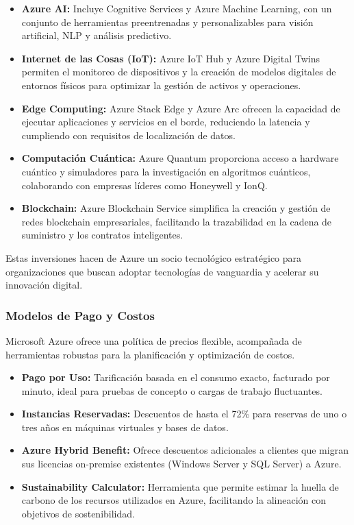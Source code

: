 {                \begin{itemize}
                    \item \textbf{Azure AI:} Incluye Cognitive Services y Azure Machine Learning, con un conjunto de herramientas preentrenadas y personalizables para visión artificial, NLP y análisis predictivo.
                    \item \textbf{Internet de las Cosas (IoT):} Azure IoT Hub y Azure Digital Twins permiten el monitoreo de dispositivos y la creación de modelos digitales de entornos físicos para optimizar la gestión de activos y operaciones.
                    \item \textbf{Edge Computing:} Azure Stack Edge y Azure Arc ofrecen la capacidad de ejecutar aplicaciones y servicios en el borde, reduciendo la latencia y cumpliendo con requisitos de localización de datos.
                    \item \textbf{Computación Cuántica:} Azure Quantum proporciona acceso a hardware cuántico y simuladores para la investigación en algoritmos cuánticos, colaborando con empresas líderes como Honeywell y IonQ.
                    \item \textbf{Blockchain:} Azure Blockchain Service simplifica la creación y gestión de redes blockchain empresariales, facilitando la trazabilidad en la cadena de suministro y los contratos inteligentes.
                \end{itemize}
                    
                Estas inversiones hacen de Azure un socio tecnológico estratégico para organizaciones que buscan adoptar tecnologías de vanguardia y acelerar su innovación digital.
            
            \subsubsection{Modelos de Pago y Costos}
                Microsoft Azure ofrece una política de precios flexible, acompañada de herramientas robustas para la planificación y optimización de costos.
                
                \begin{itemize}
                    \item \textbf{Pago por Uso:} Tarificación basada en el consumo exacto, facturado por minuto, ideal para pruebas de concepto o cargas de trabajo fluctuantes.
                    \item \textbf{Instancias Reservadas:} Descuentos de hasta el 72\% para reservas de uno o tres años en máquinas virtuales y bases de datos.
                    \item \textbf{Azure Hybrid Benefit:} Ofrece descuentos adicionales a clientes que migran sus licencias on-premise existentes (Windows Server y SQL Server) a Azure.
                    \item \textbf{Sustainability Calculator:} Herramienta que permite estimar la huella de carbono de los recursos utilizados en Azure, facilitando la alineación con objetivos de sostenibilidad.
                \end{itemize}
                    
}
